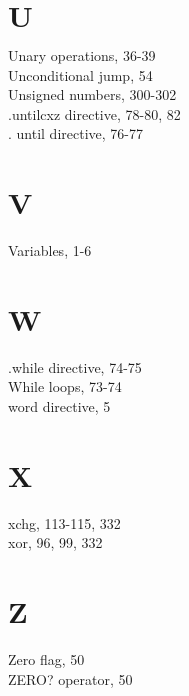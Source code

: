 \documentclass[10pt]{article}
\begin{document}
\section*{$\mathbf{U}$}
Unary operations, 36-39\\
Unconditional jump, 54\\
Unsigned numbers, 300-302\\
.untilcxz directive, 78-80, 82\\
. until directive, 76-77

\section*{V}
Variables, 1-6

\section*{W}
.while directive, 74-75\\
While loops, 73-74\\
word directive, 5

\section*{X}
xchg, 113-115, 332\\
xor, 96, 99, 332

\section*{Z}
Zero flag, 50\\
ZERO? operator, 50
\end{document}
